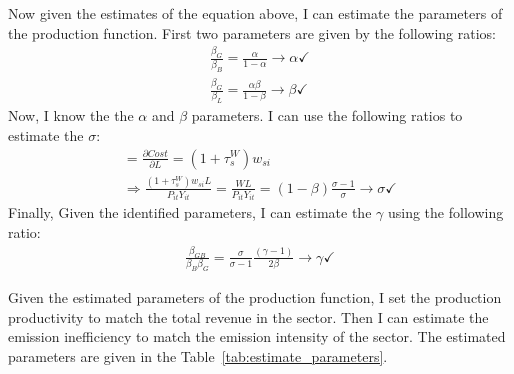 Now given the estimates of the equation above, I can estimate the parameters of the production function.  First two parameters are given by the following ratios:
\begin{gather*}
    \frac{\beta_G}{\beta_B} = \frac{\alpha}{1-\alpha} \rightarrow \alpha \checkmark\\
    \frac{\beta_G}{\beta_L} = \frac{\alpha \beta}{1-\beta} \rightarrow \beta \checkmark
\end{gather*}
Now, I know the the $\alpha$ and $\beta$ parameters. I can use the following ratios to estimate the $\sigma$:
\begin{equation*}
    \begin{split}
         = \frac{\partial Cost}{\partial L} = (1 + \tau^W_s)w_{si} \\
        \Rightarrow \frac{(1 + \tau^W_s)w_{si} L}{P_{it}Y_{it}} = \frac{W L}{P_{it}Y_{it}}= (1-\beta) \frac{\sigma-1}{\sigma} \rightarrow \sigma \checkmark
    \end{split}
\end{equation*}
Finally, Given the identified parameters, I can estimate the $\gamma$ using the following ratio:
\begin{gather*}
\frac{\beta_{GB}}{\beta_B\beta_G} = \frac{\sigma}{\sigma - 1}\frac{(\gamma-1)}{2\beta} \rightarrow \gamma \checkmark
\end{gather*}

Given the estimated parameters of the production function, I set the production productivity to match the total revenue in the sector. Then I can estimate the emission inefficiency to match the emission intensity of the sector. The estimated parameters are given in the Table~\ref{tab:estimate_parameters}.

